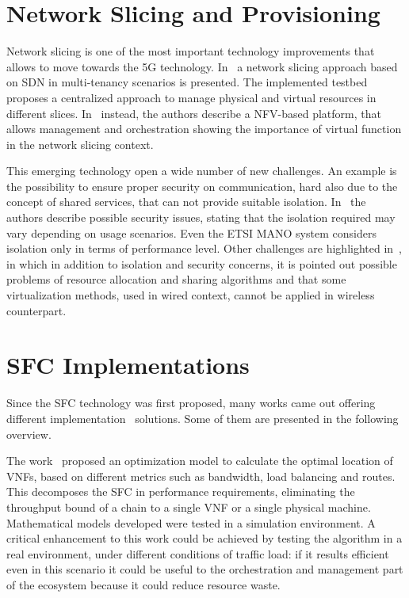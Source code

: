 \section{Network Slicing and Provisioning}
Network slicing is one of the most important technology improvements that allows
to move towards the 5G technology. In~\cite{chartsias2017sdn} a
network slicing approach based on SDN in multi-tenancy scenarios is presented.
The implemented testbed  proposes a centralized approach to manage physical and
virtual resources in different slices. In~\cite{peuster2016medicine} instead,
the authors describe a NFV-based platform, that allows management and
orchestration showing the importance of virtual function in the network slicing
context.

This emerging technology open a wide number of new challenges. An example is the
possibility to ensure proper security on communication, hard also due
to the concept of shared services, that can not provide suitable isolation. 
In~\cite{kotulski2017end} the authors describe possible security issues, stating
that the isolation required may vary depending on usage scenarios. Even the ETSI
MANO system considers isolation only in terms of performance level. Other
challenges are highlighted in~\cite{li2017network}, in which in addition to
isolation and security concerns, it is pointed out possible problems of resource
allocation and sharing algorithms and that some virtualization methods, used
in wired context, cannot be applied in wireless counterpart.

\section{SFC Implementations}

Since the SFC technology was first proposed, many works came out offering
different implementation~\cite{medhat2017service} solutions. Some of them are
presented in the following overview.

The work~\cite{GhaznaviSAB16} proposed an optimization model to calculate the
optimal location of VNFs, based on different metrics such as bandwidth, load
balancing and routes. This decomposes the SFC in performance requirements,
eliminating the throughput bound of a chain to a single VNF or a single physical
machine. Mathematical models developed were tested in a simulation environment. A
critical enhancement to this work could be achieved by testing the algorithm in
a real environment, under different conditions of traffic load: if it results
efficient even in this scenario it could be useful to the orchestration and
management part of the ecosystem because it could reduce resource waste.

